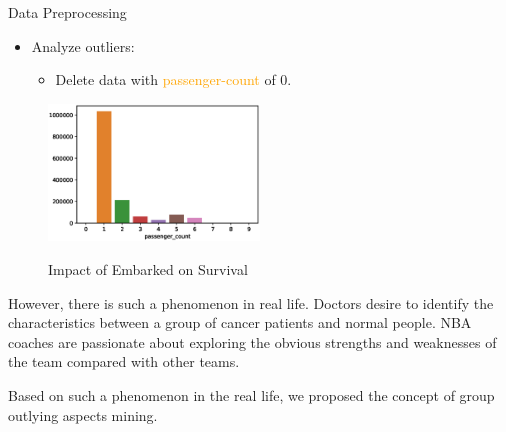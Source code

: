 \documentclass[
 size=14pt,
 paper=smartboard,  %
 mode=present, 		%
 display=slides, 	%
 style=tuliplab,  	%
 pauseslide,
 fleqn,leqno]{powerdot}
\begin{document}

\begin{slide}[toc=,bm=]{Data Preprocessing}

\begin{itemize}
\item
Analyze outliers:
\begin{itemize}
\item
Delete data with \textcolor{orange}{passenger-count} of 0.
\end{itemize}
\end{itemize}

\begin{figure}
  \centering
   \includegraphics[width=0.5\textwidth]{figure//fig-2.eps}\\
  \caption{Impact of Embarked on Survival}\label{fig:demical}
\end{figure}




\begin{note}
However,
there is such a phenomenon in real life.
Doctors desire to identify the characteristics between
a group of cancer patients and normal people.
NBA coaches are passionate about exploring the obvious strengths and
weaknesses of the team compared with other teams.

Based on such a phenomenon in the real life,
we proposed the concept of group outlying aspects mining.
\end{note}

\end{slide}

\end{document}
